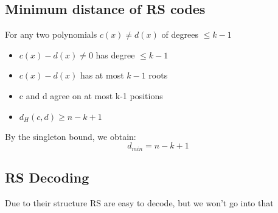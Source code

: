 \documentclass{article}[18pt]
\begin{document}
\subsection{Minimum distance of RS codes}
For any two polynomials $c(x)\neq d(x)$ of degrees $\leqslant k-1$
\begin{itemize}
	\item $c(x)-d(x)\neq 0$ has degree $\leqslant k-1$
	\item $c(x)-d(x)$ has at most $k-1$ roots
	\item c and d agree on at most k-1 positions
	\item $d_H(c,d)\geqslant n-k+1$
\end{itemize}
By the singleton bound, we obtain:
$$d_{min}=n-k+1$$
\subsection{RS Decoding}
Due to their structure RS are easy to decode, but we won't go into that
\end{document}
